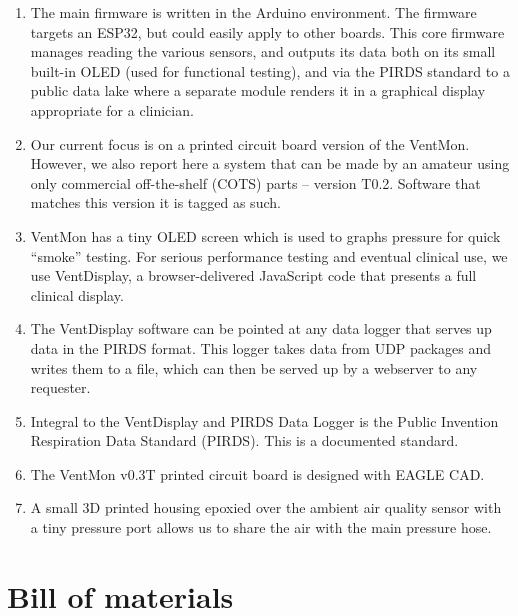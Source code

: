 \documentclass[11pt, letterpaper]{article}
\begin{document}
\begin{enumerate}
\item The main firmware is written in the Arduino environment. The firmware targets an ESP32, but could easily apply to other boards. This core firmware manages reading the various sensors, and outputs its data both on its small built-in OLED (used for functional testing), and via the PIRDS standard to a public data lake where a separate module renders it in a graphical display appropriate for a clinician.
\item Our current focus is on a printed circuit board version of the VentMon\cite{ventmonpcb}. However, we also report here a system that can be made by an amateur using only commercial off-the-shelf (COTS) parts -- version T0.2. Software that matches this version it is tagged as such.
\item VentMon has a tiny OLED screen which is used to graphs pressure for quick ``smoke'' testing. For serious performance testing and eventual clinical use, we use VentDisplay, a browser-delivered JavaScript code that presents a full clinical display.
\item The VentDisplay software can be pointed at any data logger that serves up data in the PIRDS format. This logger takes data from UDP packages and writes them to a file, which can then be served up by a webserver to any requester.
\item Integral to the VentDisplay and PIRDS Data Logger is the Public Invention Respiration Data Standard (PIRDS). This is a documented standard.
\item The VentMon v0.3T printed circuit board is designed with EAGLE CAD.
\item A small 3D printed housing epoxied over the ambient air quality sensor with a tiny pressure port allows us to share the air with the main pressure hose.
\end{enumerate}



\section{Bill of materials}

\end{document}
